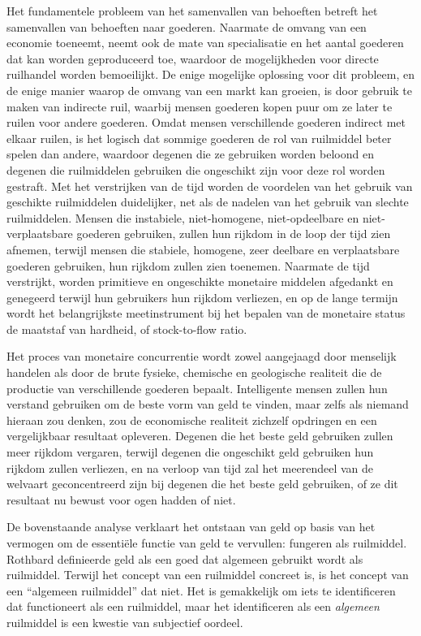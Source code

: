 Het fundamentele probleem van het samenvallen van behoeften betreft het samenvallen van behoeften naar goederen. Naarmate de omvang van een economie toeneemt, neemt ook de mate van specialisatie en het aantal goederen dat kan worden geproduceerd toe, waardoor de mogelijkheden voor directe ruilhandel worden bemoeilijkt. De enige mogelijke oplossing voor dit probleem, en de enige manier waarop de omvang van een markt kan groeien, is door gebruik te maken van indirecte ruil, waarbij mensen goederen kopen puur om ze later te ruilen voor andere goederen. Omdat mensen verschillende goederen indirect met elkaar ruilen, is het logisch dat sommige goederen de rol van ruilmiddel beter spelen dan andere, waardoor degenen die ze gebruiken worden beloond en degenen die ruilmiddelen gebruiken die ongeschikt zijn voor deze rol worden gestraft. Met het verstrijken van de tijd worden de voordelen van het gebruik van geschikte ruilmiddelen duidelijker, net als de nadelen van het gebruik van slechte ruilmiddelen. Mensen die instabiele, niet-homogene, niet-opdeelbare en niet-verplaatsbare goederen gebruiken, zullen hun rijkdom in de loop der tijd zien afnemen, terwijl mensen die stabiele, homogene, zeer deelbare en verplaatsbare goederen gebruiken, hun rijkdom zullen zien toenemen. Naarmate de tijd verstrijkt, worden primitieve en ongeschikte monetaire middelen afgedankt en genegeerd terwijl hun gebruikers hun rijkdom verliezen, en op de lange termijn wordt het belangrijkste meetinstrument bij het bepalen van de monetaire status de maatstaf van hardheid, of stock-to-flow ratio.

Het proces van monetaire concurrentie wordt zowel aangejaagd door menselijk handelen als door de brute fysieke, chemische en geologische realiteit die de productie van verschillende goederen bepaalt. Intelligente mensen zullen hun verstand gebruiken om de beste vorm van geld te vinden, maar zelfs als niemand hieraan zou denken, zou de economische realiteit zichzelf opdringen en een vergelijkbaar resultaat opleveren. Degenen die het beste geld gebruiken zullen meer rijkdom vergaren, terwijl degenen die ongeschikt geld gebruiken hun rijkdom zullen verliezen, en na verloop van tijd zal het meerendeel van de welvaart geconcentreerd zijn bij degenen die het beste geld gebruiken, of ze dit resultaat nu bewust voor ogen hadden of niet.

De bovenstaande analyse verklaart het ontstaan van geld op basis van het vermogen om de essentiële functie van geld te vervullen: fungeren als ruilmiddel. Rothbard definieerde geld als een goed dat algemeen gebruikt wordt als ruilmiddel. Terwijl het concept van een ruilmiddel concreet is, is het concept van een ``algemeen ruilmiddel'' dat niet. Het is gemakkelijk om iets te identificeren dat functioneert als een ruilmiddel, maar het identificeren als een \textit{algemeen} ruilmiddel is een kwestie van subjectief oordeel.

